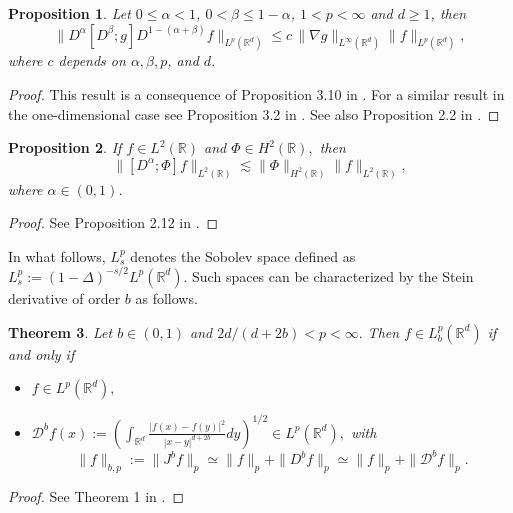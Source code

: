 \documentclass[reqno]{amsart}
\newcommand{\R}{\mathbb R}
\numberwithin{equation}{section}
\newtheorem{theorem}{Theorem}[section]
\newtheorem{proposition}[theorem]{Proposition}
\begin{document}
\begin{proposition}\label{ComuDerivada}
	Let $0\leq \alpha<1$, $0<\beta\leq 1-\alpha$, $1<p<\infty$ and $d\geq 1$, then 
	\begin{equation*}
	\|D^{\alpha}[D^{\beta};g]D^{1-(\alpha+\beta)}f\|_{L^p(\R^d)}\leq c\, \|\nabla g\|_{L^\infty(\R^d)}\|f\|_{L^p(\R^d)},
	\end{equation*}
where $c$ depends on $\alpha,\beta,p$, and $d$.
\end{proposition}
\begin{proof}
	This result is a consequence of Proposition 3.10 in \cite{dong}. For a similar result in the one-dimensional case see Proposition 3.2 in \cite{Dawson}. See also Proposition 2.2 in \cite{FLP1}.
\end{proof}



\begin{proposition}\label{C}
	If $f\in L^{2}(\R)$ and $\Phi \in H^{2}(\R),$ then
\begin{equation*}
\|[D^{\alpha};\Phi]f\|_{L^2(\R)}\lesssim \|\Phi\|_{H^2(\R)}\|f\|_{L^2(\R)},
\end{equation*}
where $\alpha \in (0,1)$.
\end{proposition}
\begin{proof}
See Proposition 2.12 in \cite{dBO}.
\end{proof}


In what follows, $L^{p}_{s}$ denotes the Sobolev space defined as $L^{p}_{s}:=(1-\Delta)^{-s/2}L^{p}(\R^d)$. Such spaces
can be characterized by the Stein derivative of order $b$ as follows.

\begin{theorem}\label{stein}
	Let $b\in (0,1)$ and $2d/(d+2b)<p<\infty.$ Then $f\in L^{p}_{b}(\R^{d})$ if and only if
	\begin{itemize}
		\item [a)] $f\in L^{p}(\R^{d}),$ 
		\item [b)]
		$\mathcal{D}^{b}f(x):={\displaystyle \left (
			\int_{\R^{d}}\frac{|f(x)-f(y)|^{2}}{|x-y|^{d+2b}}dy\right)^{1/2}} \in
		L^{p}(\R^{d}),$ with
		\begin{equation}\label{equiv}
		\|f\|_{b,p}:=\|J^{b}f\|_{p}\simeq \|f\|_{p}+\|D^{b}f\|_{p}\simeq \|f\|_{p}+\|\mathcal{D}^{b}f\|_{p}.
		\end{equation}
	\end{itemize}
\end{theorem}
\begin{proof}
	See Theorem 1 in \cite{Stein}.
\end{proof}
\end{document}

